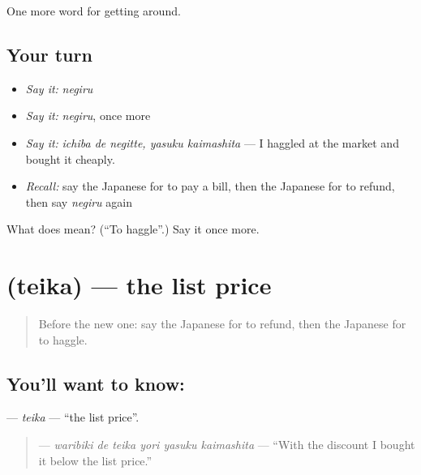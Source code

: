 \begin{grammarlens}[title={What you've built}]
One more word for getting around.
\end{grammarlens}

\subsection*{Your turn}
\begin{itemize}
\raggedright
  \item \emph{Say it:} \emph{negiru}
  \item \emph{Say it:} \emph{negiru}, once more
  \item \emph{Say it:} \emph{ichiba de negitte, yasuku kaimashita} — I haggled at the market and bought it cheaply.
  \item \emph{Recall:} say the Japanese for to pay a bill, then the Japanese for to refund, then say \emph{negiru} again
\end{itemize}

\begin{tcolorbox}[breakable,colback=teal!4,colframe=teal!35!black,title={Before you move on}]
What does  mean? (\textquotedblleft{}To haggle\textquotedblright{}.) Say it once more.
\end{tcolorbox}
\section[\texorpdfstring{\ja{ていか} (teika)}{ていか (teika)}]{ (teika) — the list price}

\label{lesson:JA-C421-teika}



\begin{quote}
Before the new one: say the Japanese for to refund, then the Japanese for to haggle.
\end{quote}

\subsection*{You'll want to know: }
\textbf{} — \emph{teika} — \textquotedblleft{}the list price\textquotedblright{}.

\begin{quote}
\textbf{   } — \emph{waribiki de teika yori yasuku kaimashita} — \textquotedblleft{}With the discount I bought it below the list price.\textquotedblright{}
\end{quote}

